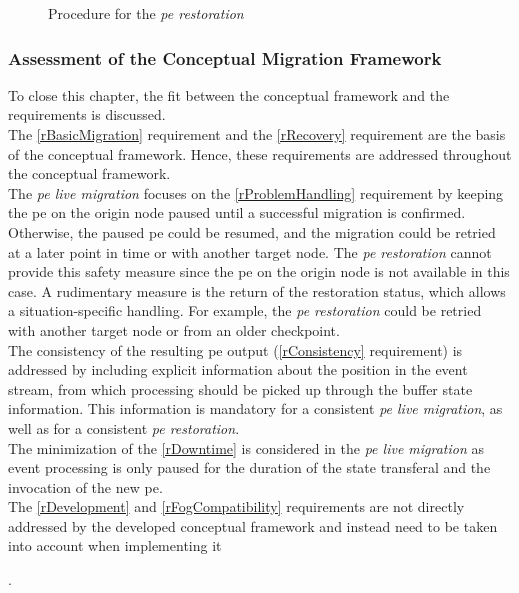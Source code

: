 \begin{figure}[!ht]
\graphicspath{{./figures/code/}}

\caption{Procedure for the \textit{\acrshort{pe} restoration}}
\label{fOSR}
\end{figure}

\subsubsection{Assessment of the Conceptual Migration Framework}
\label{lEvaluationOfMigrationConcept}
To close this chapter, the fit between the conceptual framework and the requirements is discussed.\\
The \ref{rBasicMigration} requirement and the \ref{rRecovery} requirement are the basis of the conceptual framework. Hence, these requirements are addressed throughout the conceptual framework.\\
The \textit{\acrshort{pe} live migration} focuses on the \ref{rProblemHandling} requirement by keeping the \gls{pe} on the origin node paused until a successful migration is confirmed. Otherwise, the paused \gls{pe} could be resumed, and the migration could be retried at a later point in time or with another target node. The \textit{\acrshort{pe} restoration} cannot provide this safety measure since the \gls{pe} on the origin node is not available in this case. A rudimentary measure is the return of the restoration status, which allows a situation-specific handling. For example, the \textit{\acrshort{pe} restoration} could be retried with another target node or from an older checkpoint.\\
The consistency of the resulting \gls{pe} output (\ref{rConsistency} requirement) is addressed by including explicit information about the position in the event stream, from which processing should be picked up through the buffer state information. This information is mandatory for a consistent \textit{\acrshort{pe} live migration}, as well as for a consistent \textit{\acrshort{pe} restoration}.\\
The minimization of the \ref{rDowntime} is considered in the \textit{\acrshort{pe} live migration} as event processing is only paused for the duration of the state transferal and the invocation of the new \gls{pe}.\\
The \ref{rDevelopment} and \ref{rFogCompatibility} requirements are not directly addressed by the developed conceptual framework and instead need to be taken into account when implementing it.